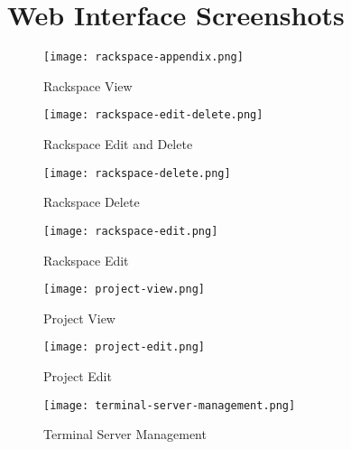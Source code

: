 \chapter{Web Interface Screenshots}
\label{chap:appendix-c}
\begin{figure}[H]
    \centering
    \texttt{[image: rackspace-appendix.png]}
    \caption{Rackspace View}
    \label{fig:rackspace-view}
\end{figure}

\begin{figure}[H]
    \centering
    \texttt{[image: rackspace-edit-delete.png]}
    \caption{Rackspace Edit and Delete}
    \label{fig:rackspace-edit-delete}
\end{figure}

\begin{figure}[H]
    \centering
    \texttt{[image: rackspace-delete.png]}
    \caption{Rackspace Delete}
    \label{fig:rackspace-delete}
\end{figure}

\begin{figure}[H]
    \centering
    \texttt{[image: rackspace-edit.png]}
    \caption{Rackspace Edit}
    \label{fig:rackspace-edit}
\end{figure}

\begin{figure}[H]
    \centering
    \texttt{[image: project-view.png]}
    \caption{Project View}
    \label{fig:project-view}
\end{figure}

\begin{figure}[H]
    \centering
    \texttt{[image: project-edit.png]}
    \caption{Project Edit}
    \label{fig:project-edit}
\end{figure}

\begin{figure}[H]
    \centering
    \texttt{[image: terminal-server-management.png]}
    \caption{Terminal Server Management}
    \label{fig:terminal-server-management}
\end{figure}
